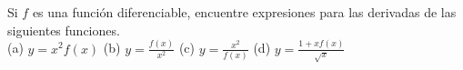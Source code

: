 \item Si $f$ es una función diferenciable, encuentre expresiones para las derivadas de las siguientes funciones. \\
(a) $y = x^2 f(x)$ \quad
(b) $\displaystyle y = \frac{f(x)}{x^2}$ \quad
(c) $\displaystyle y = \frac{x^2}{f(x)}$ \quad
(d) $\displaystyle y = \frac{1 + x f(x)}{\sqrt{x}}$
